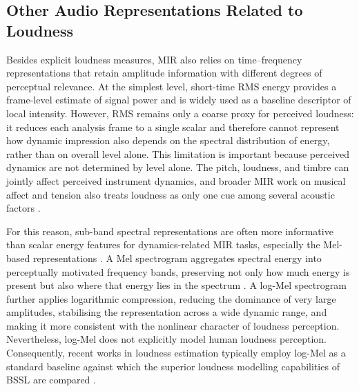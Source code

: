 \subsection{Other Audio Representations Related to Loudness}

Besides explicit loudness measures, MIR also relies on time--frequency representations that retain amplitude information with different degrees of perceptual relevance. At the simplest level, short-time RMS energy provides a frame-level estimate of signal power and is widely used as a baseline descriptor of local intensity. However, RMS remains only a coarse proxy for perceived loudness: it reduces each analysis frame to a single scalar and therefore cannot represent how dynamic impression also depends on the spectral distribution of energy, rather than on overall level alone. This limitation is important because perceived dynamics are not determined by level alone. The pitch, loudness, and timbre can jointly affect perceived instrument dynamics, and broader MIR work on musical affect and tension also treats loudness as only one cue among several acoustic factors \cite{panda2023audiofeatures,fabiani2011influence,barchet2024tensemusic}.

For this reason, sub-band spectral representations are often more informative than scalar energy features for dynamics-related MIR tasks, especially the Mel-based representations \cite{fu2011survey,nam2019deeplearningaudio,panda2023audiofeatures,mcloughlin2026spectrogramfeatures}. A Mel spectrogram aggregates spectral energy into perceptually motivated frequency bands, preserving not only how much energy is present but also where that energy lies in the spectrum \cite{slaney1998auditory}. A log-Mel spectrogram further applies logarithmic compression, reducing the dominance of very large amplitudes, stabilising the representation across a wide dynamic range, and making it more consistent with the nonlinear character of loudness perception. Nevertheless, log-Mel does not explicitly model human loudness perception. Consequently, recent works in loudness estimation typically employ log-Mel as a standard baseline against which the superior loudness modelling capabilities of BSSL are compared \cite{narang2024automatic, he2026dynest}.

